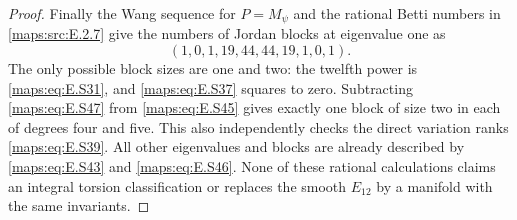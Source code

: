 \begin{proof}
Finally the Wang sequence for $P=M_\psi$ and the rational
Betti numbers in \ref{maps:src:E.2.7} give the numbers of Jordan blocks
at eigenvalue one as
\[
          (1,0,1,19,44,44,19,1,0,1).
 \tag{E.S47}\label{maps:eq:E.S47}
\]
The only possible block sizes are one and two: the
twelfth power is \eqref{maps:eq:E.S31}, and \eqref{maps:eq:E.S37} squares to zero.
Subtracting \eqref{maps:eq:E.S47} from \eqref{maps:eq:E.S45} gives exactly one block
of size two in each of degrees four and five. This also
independently checks the direct variation ranks \eqref{maps:eq:E.S39}.
All other eigenvalues and blocks are already described
by \eqref{maps:eq:E.S43} and \eqref{maps:eq:E.S46}. None of these rational calculations
claims an integral torsion classification or replaces the
smooth $E_{12}$ by a manifold with the same invariants.
\end{proof}


